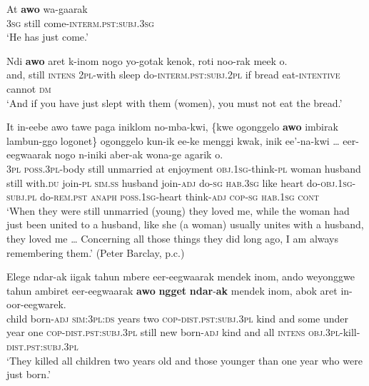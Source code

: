 \begin{exe}
	\ex\label{exAppendixWesternDaniImmediatePast1}
	\gll At \textbf{awo} wa-gaarak\\
	3\textsc{sg} still come-\textsc{interm.pst}:\textsc{subj}.3\textsc{sg}\\
	\glt \lq He has just come.' \parencite[440]{Barclay2008}

	\ex\label{exAppendixWesternDaniImmediatePast2}
	\gll Ndi \textbf{awo} aret k-inom nogo yo-gotak kenok, roti noo-rak meek o.\\
	and, still \textsc{intens} 2\textsc{pl}-with sleep do-\textsc{interm.pst}:\textsc{subj}.2\textsc{pl} if bread eat-\textsc{intentive} cannot \textsc{dm}\\
	\glt \lq And if you have just slept with them (women), you must not eat the bread.' 	\parencite[175]{Barclay2008}

	\ex\label{exAppendixWesternDaniImmediatePast3}
	\gll It in-eebe awo tawe paga iniklom no-mba-kwi, \{kwe ogonggelo \textbf{awo} imbirak lambun-ggo logonet\} ogonggelo kun-ik ee-ke menggi kwak, inik ee'-na-kwi … eer-eegwaarak nogo n-iniki aber-ak wona-ge agarik o.\\
	3\textsc{pl} \textsc{poss}.3\textsc{pl}-body still unmarried at enjoyment \textsc{obj}.1\textsc{sg}-think-\textsc{pl} woman husband still with.\textsc{du} join-\textsc{pl} \textsc{sim}.\textsc{ss} husband join-\textsc{adj} do-\textsc{sg} \textsc{hab}.3\textsc{sg} like heart do-\textsc{obj}.1\textsc{sg}-\textsc{subj}.\textsc{pl} {} do-\textsc{rem}.\textsc{pst} \textsc{anaph} \textsc{poss}.1\textsc{sg}-heart think-\textsc{adj} \textsc{cop}-\textsc{sg} \textsc{hab}.1\textsc{sg} \textsc{cont}\\
	\glt \lq When they were still unmarried (young) they loved me, while the woman had just been united to a husband, like she (a woman) usually unites with a husband, they loved me … Concerning all those things they did long ago, I am always remembering them.' (Peter Barclay, p.c.)

	\ex\label{exAppendixWesternDaniImmediatePast4}
	\gll Elege ndar-ak iigak tahun mbere	eer-eegwaarak mendek inom, ando weyonggwe tahun ambiret eer-eegwaarak \textbf{awo} \textbf{ngget} \textbf{ndar}-\textbf{ak} mendek inom, abok aret in-oor-eegwarek.\\
	child born-\textsc{adj} \textsc{sim}:3\textsc{pl}:\textsc{ds} years two \textsc{cop}-\textsc{dist.pst}:\textsc{subj}.3\textsc{pl} kind and some under year one \textsc{cop}-\textsc{dist.pst}:\textsc{subj}.3\textsc{pl} still new born-\textsc{adj} kind and all \textsc{intens} \textsc{obj}.3\textsc{pl}-kill-\textsc{dist.pst}:\textsc{subj}.3\textsc{pl}\\
	\glt \lq They killed all children two years old and those younger than one year who were just born.' \parencite[440]{Barclay2008}
\end{exe}
